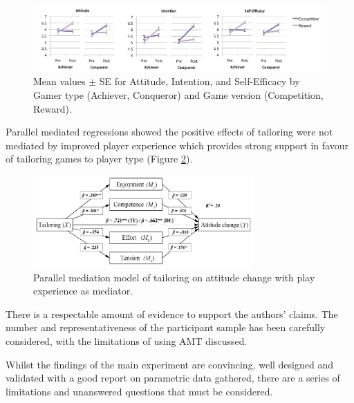 \documentclass[11pt]{article}
\begin{document}
\begin{figure}[H]
\centering
\includegraphics[width=\textwidth]{img/orji2017-tailoring-results.png} 
\caption{Mean values $\pm$ SE for Attitude, Intention, and Self-Efficacy by Gamer type (Achiever, Conqueror) and Game version (Competition, Reward).}\label{fig:orji2017-tailoring-results}
\end{figure}

Parallel mediated regressions \citep{hayes2013} showed the positive effects of tailoring were not mediated by improved player experience which provides strong support in favour of tailoring games to player type (Figure \ref{fig:orji2017-tailoring-mediation-results}). 

\begin{figure}[H]
\centering
\includegraphics[width=0.75\textwidth]{img/orji2017-tailoring-mediation-results.png} 
\caption{Parallel mediation model of tailoring on attitude change with play experience as mediator.}\label{fig:orji2017-tailoring-mediation-results}
\end{figure}

There is a respectable amount of evidence to support the authors' claims. The number and representativeness of the participant sample has been carefully considered, with the limitations of using AMT discussed.

Whilst the findings of the main experiment are convincing, well designed and validated with a good report on parametric data gathered, there are a series of limitations and unanswered questions that must be considered.
\end{document}
